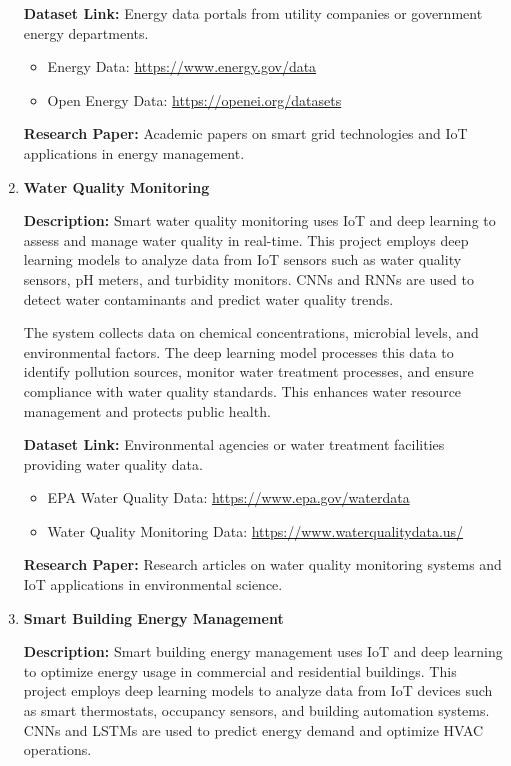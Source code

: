 \documentclass{article}
\begin{document}
\begin{enumerate}[label=\textbf{\arabic*.}, leftmargin=*]
\textbf{Dataset Link:} Energy data portals from utility companies or government energy departments.
\begin{itemize}
    \item Energy Data: \url{https://www.energy.gov/data}
    \item Open Energy Data: \url{https://openei.org/datasets}
\end{itemize}

\textbf{Research Paper:} Academic papers on smart grid technologies and IoT applications in energy management.

\item \textbf{Water Quality Monitoring}

\textbf{Description:}
Smart water quality monitoring uses IoT and deep learning to assess and manage water quality in real-time. This project employs deep learning models to analyze data from IoT sensors such as water quality sensors, pH meters, and turbidity monitors. CNNs and RNNs are used to detect water contaminants and predict water quality trends.

The system collects data on chemical concentrations, microbial levels, and environmental factors. The deep learning model processes this data to identify pollution sources, monitor water treatment processes, and ensure compliance with water quality standards. This enhances water resource management and protects public health.

\textbf{Dataset Link:} Environmental agencies or water treatment facilities providing water quality data.
\begin{itemize}
    \item EPA Water Quality Data: \url{https://www.epa.gov/waterdata}
    \item Water Quality Monitoring Data: \url{https://www.waterqualitydata.us/}
\end{itemize}

\textbf{Research Paper:} Research articles on water quality monitoring systems and IoT applications in environmental science.

\item \textbf{Smart Building Energy Management}

\textbf{Description:}
Smart building energy management uses IoT and deep learning to optimize energy usage in commercial and residential buildings. This project employs deep learning models to analyze data from IoT devices such as smart thermostats, occupancy sensors, and building automation systems. CNNs and LSTMs are used to predict energy demand and optimize HVAC operations.


\end{enumerate}
\end{document}
